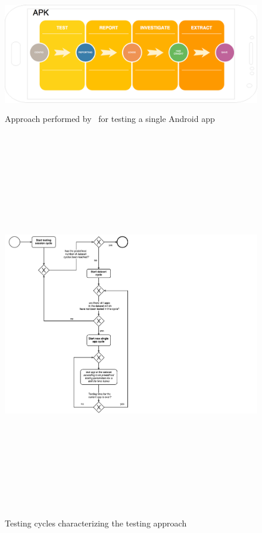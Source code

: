 \begin{figure}[tb]
\centering 
\includegraphics[width=12.5cm,height=5cm]{imgs/apkprocess} 
\caption{Approach performed by \toolname\ for testing a single Android app}
\label{fig: apkprocess}
\end{figure}

\begin{figure}[tb]
\centering 
\includegraphics[width=13cm,height=17cm]{diagrams/testingapproach} 
\caption{Testing cycles characterizing the testing approach}
\label{fig: testingapproach}
\end{figure}

